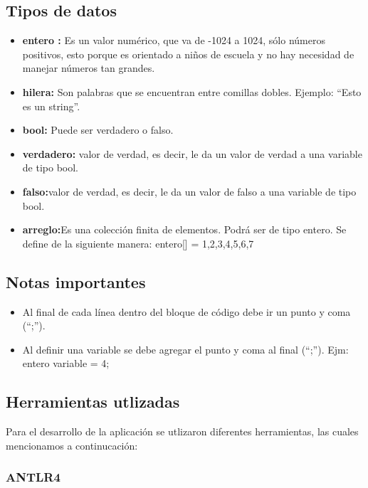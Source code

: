 \documentclass[%
 aip,
 jmp,%
 amsmath,amssymb,
 reprint,%
]{revtex4-1}
\begin{document}
\subsection{\label{sec:level2}Tipos de datos}
  

\begin{itemize}
\item\textbf{entero : }Es un valor numérico, que va de -1024 a 1024, sólo números positivos, esto porque es orientado a niños de escuela y no hay necesidad de manejar números tan grandes.
\item\textbf{hilera:} Son palabras que se encuentran  entre comillas dobles. Ejemplo: “Esto es un string”.
\item\textbf{bool:} Puede ser verdadero o falso.
\item\textbf{verdadero: }valor de verdad, es decir, le da un valor de verdad a una variable de tipo bool.
\item\textbf{falso:}valor de verdad, es decir, le da un valor de falso a una variable de tipo bool.
\item\textbf{arreglo:}Es una colección finita de elementos. Podrá ser de tipo entero. Se define de la siguiente manera:
entero[] = {1,2,3,4,5,6,7}
\end{itemize}



\subsection{\label{sec:level2}Notas importantes}
\begin{itemize}
\item Al final de cada línea dentro del bloque de código debe ir un punto y coma (“;”).
\item Al definir una variable se debe agregar el punto y coma al final (“;”).
Ejm:\\
entero variable = 4;
\end{itemize}


\vspace{5cm}
\subsection{\label{sec:level2}Herramientas utlizadas}

Para el desarrollo de la aplicación se utlizaron diferentes herramientas, las cuales mencionamos a continucación:

\subsubsection{\label{sec:level3}ANTLR4}
\end{document}
